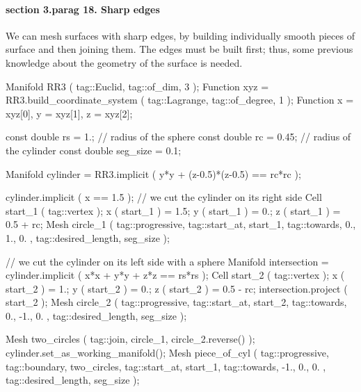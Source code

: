 



\paragraph{\numb section 3.\numb parag 18. Sharp edges}

We can mesh surfaces with sharp edges, by building individually smooth pieces of surface
and then {\codett join}ing them.
The edges must be built first;
thus, some previous knowledge about the geometry of the surface is needed.

\verbatim
   Manifold RR3 ( tag::Euclid, tag::of_dim, 3 );
   Function xyz = RR3.build_coordinate_system ( tag::Lagrange, tag::of_degree, 1 );
   Function x = xyz[0],  y = xyz[1],  z = xyz[2];

   const double rs = 1.;    // radius of the sphere
   const double rc = 0.45;  // radius of the cylinder
   const double seg_size = 0.1;

   Manifold cylinder = RR3.implicit ( y*y + (z-0.5)*(z-0.5) == rc*rc );

   cylinder.implicit ( x == 1.5 );  // we cut the cylinder on its right side
   Cell start_1 ( tag::vertex );
   x ( start_1 ) = 1.5;  y ( start_1 ) = 0.;  z ( start_1 ) = 0.5 + rc;
   Mesh circle_1 ( tag::progressive, tag::start_at, start_1,
                   tag::towards, { 0., 1., 0. }, tag::desired_length, seg_size );

   // we cut the cylinder on its left side with a sphere
   Manifold intersection = cylinder.implicit ( x*x + y*y + z*z == rs*rs );
   Cell start_2 ( tag::vertex );
   x ( start_2 ) = 1.;  y ( start_2 ) = 0.;  z ( start_2 ) = 0.5 - rc;
   intersection.project ( start_2 );
   Mesh circle_2 ( tag::progressive, tag::start_at, start_2,
                   tag::towards, { 0., -1., 0. }, tag::desired_length, seg_size );

   Mesh two_circles ( tag::join, circle_1, circle_2.reverse() );
   cylinder.set_as_working_manifold();
   Mesh piece_of_cyl ( tag::progressive, tag::boundary, two_circles,
                       tag::start_at, start_1, tag::towards, { -1., 0., 0. },
                       tag::desired_length, seg_size                          );


